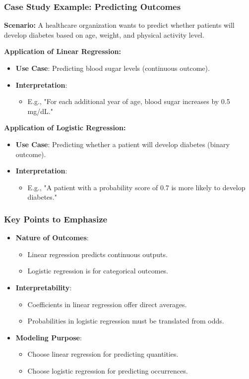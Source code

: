 \documentclass[aspectratio=169]{beamer}
\begin{document}
\begin{frame}[fragile]
    \frametitle{Case Study Example: Predicting Outcomes}
    \textbf{Scenario:} A healthcare organization wants to predict whether patients will develop diabetes based on age, weight, and physical activity level.

    \textbf{Application of Linear Regression:}
    \begin{itemize}
        \item \textbf{Use Case}: Predicting blood sugar levels (continuous outcome).
        \item \textbf{Interpretation}: 
        \begin{itemize}
            \item E.g., "For each additional year of age, blood sugar increases by 0.5 mg/dL."
        \end{itemize}
    \end{itemize}

    \textbf{Application of Logistic Regression:}
    \begin{itemize}
        \item \textbf{Use Case}: Predicting whether a patient will develop diabetes (binary outcome).
        \item \textbf{Interpretation}:
        \begin{itemize}
            \item E.g., "A patient with a probability score of 0.7 is more likely to develop diabetes."
        \end{itemize}
    \end{itemize}
\end{frame}

\begin{frame}[fragile]
    \frametitle{Key Points to Emphasize}
    \begin{itemize}
        \item \textbf{Nature of Outcomes}:
        \begin{itemize}
            \item Linear regression predicts continuous outputs.
            \item Logistic regression is for categorical outcomes.
        \end{itemize}
        \item \textbf{Interpretability}:
        \begin{itemize}
            \item Coefficients in linear regression offer direct averages.
            \item Probabilities in logistic regression must be translated from odds.
        \end{itemize}
        \item \textbf{Modeling Purpose}:
        \begin{itemize}
            \item Choose linear regression for predicting quantities.
            \item Choose logistic regression for predicting occurrences.
        \end{itemize}
    \end{itemize}
\end{frame}
\end{document}
